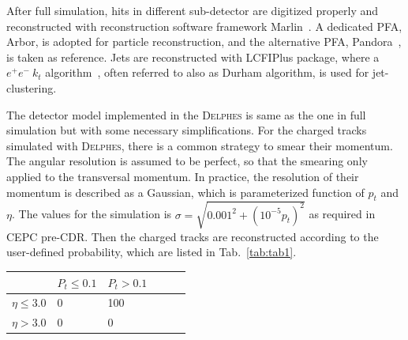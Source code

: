 \documentclass[a4paper,10pt,twoside]{cpc-hepnp}
\begin{document}

After full simulation,  hits in different sub-detector are digitized properly and reconstructed with reconstruction software framework Marlin{~\cite{ref:marlin}}.   A dedicated PFA, Arbor\cite{ref:arbor},  is adopted for particle reconstruction, and the alternative PFA, Pandora{~\cite{ref:pandora}}, is taken as reference. Jets are reconstructed with LCFIPlus package\cite{ref:lcfiplus}, where a $e^+e^-~k_t$ algorithm{~\cite{ref:eekt}},  often referred to also as {\sf Durham} algorithm,  is used for jet-clustering. 

The detector model implemented in the {\textsc{Delphes}} is same as the one in full simulation but with some necessary simplifications. For the charged tracks simulated with {\textsc{Delphes}}, there is a common strategy to smear their momentum. The angular resolution is assumed to be perfect, so that the smearing only applied to the transversal momentum. In practice, the resolution of their momentum is described as a Gaussian, which is parameterized function of $p_t$ and $\eta$. The values for the simulation is $\sigma=\sqrt{0.001^2+(10^{-5}p_t)^2}$ as required in CEPC pre-CDR. Then the charged tracks are  reconstructed according to the user-defined probability, which are listed in Tab.~\ref{tab:tab1}.
\begin{center}
\begin{tabular}{@{}*{3}{ll}}
\hline \hline
		& $P_t\le0.1$ & $P_t>0.1$ \\ \hline\hline
$\eta\le3.0$  & 0 		     & 100  \\
$\eta>3.0$    & 0 		     & 0 \\
\hline \hline
\end{tabular}
\end{center}
\end{document}
